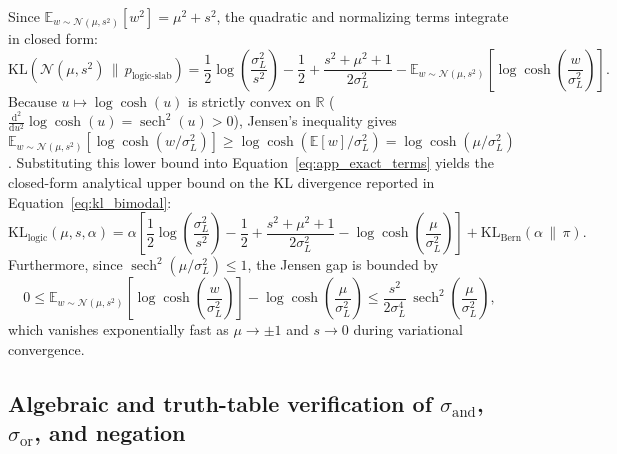 \documentclass[11pt,a4paper]{article}
\begin{document}
Since $\mathbb{E}_{w \sim \mathcal{N}(\mu, s^2)}[w^2] = \mu^2 + s^2$, the quadratic and normalizing terms integrate in closed form:
\begin{equation}
\label{eq:app_exact_terms}
\mathrm{KL}\!\left(\mathcal{N}(\mu, s^2) \,\|\, p_{\text{logic-slab}}\right) = \frac{1}{2}\log\!\left(\frac{\sigma_L^2}{s^2}\right) - \frac{1}{2} + \frac{s^2 + \mu^2 + 1}{2\sigma_L^2} - \mathbb{E}_{w \sim \mathcal{N}(\mu, s^2)}\!\left[\log\cosh\!\left(\frac{w}{\sigma_L^2}\right)\right].
\end{equation}
Because $u \mapsto \log\cosh(u)$ is strictly convex on $\mathbb{R}$ ($\frac{\mathrm{d}^2}{\mathrm{d}u^2}\log\cosh(u) = \operatorname{sech}^2(u) > 0$), Jensen's inequality gives $\mathbb{E}_{w \sim \mathcal{N}(\mu, s^2)}\!\left[\log\cosh(w/\sigma_L^2)\right] \ge \log\cosh(\mathbb{E}[w]/\sigma_L^2) = \log\cosh(\mu/\sigma_L^2)$. Substituting this lower bound into Equation~\eqref{eq:app_exact_terms} yields the closed-form analytical upper bound on the KL divergence reported in Equation~\eqref{eq:kl_bimodal}:
\begin{equation}
\label{eq:app_final_bound}
\mathrm{KL}_{\text{logic}}(\mu, s, \alpha) = \alpha\!\left[\frac{1}{2}\log\!\left(\frac{\sigma_L^2}{s^2}\right) - \frac{1}{2} + \frac{s^2 + \mu^2 + 1}{2\sigma_L^2} - \log\cosh\!\left(\frac{\mu}{\sigma_L^2}\right)\right] + \mathrm{KL}_{\text{Bern}}(\alpha \,\|\, \pi).
\end{equation}
Furthermore, since $\operatorname{sech}^2(\mu/\sigma_L^2) \le 1$, the Jensen gap is bounded by
\begin{equation*}
0 \le \mathbb{E}_{w \sim \mathcal{N}(\mu, s^2)}\!\left[\log\cosh\!\left(\frac{w}{\sigma_L^2}\right)\right] - \log\cosh\!\left(\frac{\mu}{\sigma_L^2}\right) \le \frac{s^2}{2\sigma_L^4}\,\operatorname{sech}^2\!\left(\frac{\mu}{\sigma_L^2}\right),
\end{equation*}
which vanishes exponentially fast as $\mu \to \pm 1$ and $s \to 0$ during variational convergence.

\subsection{Algebraic and truth-table verification of \texorpdfstring{$\sigma_{\text{and}}$, $\sigma_{\text{or}}$}{AND, OR}, and negation}
\label{app:logic_truth}
\end{document}
